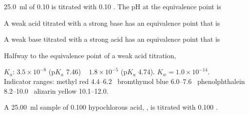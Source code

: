 \documentclass{apchem-exam}
\begin{document}
\begin{mcq}
  \SI{25.0}{\milli\litre} of \SI{0.10}{\Molar}  is titrated with
  \SI{0.10}{\Molar} . The pH at the equivalence point is
  \choices
\end{mcq}

\begin{mcq}
  A weak acid titrated with a strong base has an equivalence point that is
  \choices
\end{mcq}

\begin{mcq}
  A weak base titrated with a strong acid has an equivalence point that is
  \choices
\end{mcq}

\begin{mcq}
  Halfway to the equivalence point of a weak acid titration,
  \choices
\end{mcq}


\begin{apcnote}[Data]
$K_a$:  $3.5\times10^{-8}$ (p$K_a$ 7.46) \textbullet\
 $1.8\times10^{-5}$ (p$K_a$ 4.74).
$K_w = 1.0\times10^{-14}$. \\
Indicator ranges: methyl red 4.4--6.2 \textbullet\ bromthymol blue
6.0--7.6 \textbullet\ phenolphthalein 8.2--10.0 \textbullet\ alizarin yellow
10.1--12.0.
\end{apcnote}


A \SI{25.00}{\milli\litre} sample of \SI{0.100}{\Molar} hypochlorous acid,
\ce{HOCl}, is titrated with \SI{0.100}{\Molar} \ce{NaOH}.
\end{document}
